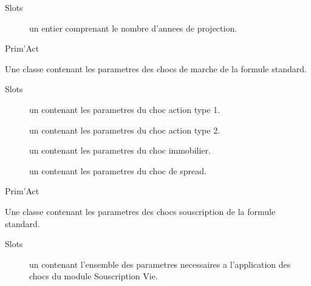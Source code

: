 \documentclass[a4paper]{book}
\begin{document}
%
\begin{Section}{Slots}

\begin{description}

\item[] un entier comprenant le nombre d'annees de projection.

\end{description}
\end{Section}
%
\begin{Author}\relax
Prim'Act
\end{Author}
%
\begin{Description}\relax
Une classe contenant les parametres des chocs de marche de la formule standard.
\end{Description}
%
\begin{Section}{Slots}

\begin{description}

\item[] un  contenant les parametres du choc action type 1.

\item[] un  contenant les parametres du choc action type 2.

\item[] un  contenant les parametres du choc immobilier.

\item[] un  contenant les parametres du choc de spread.

\end{description}
\end{Section}
%
\begin{Author}\relax
Prim'Act
\end{Author}
%
\begin{Description}\relax
Une classe contenant les parametres des chocs souscription de la formule standard.
\end{Description}
%
\begin{Section}{Slots}

\begin{description}

\item[] un  contenant l'ensemble des parametres necessaires a l'application des
chocs du module Souscription Vie.

\end{description}
\end{Section}
\end{document}
